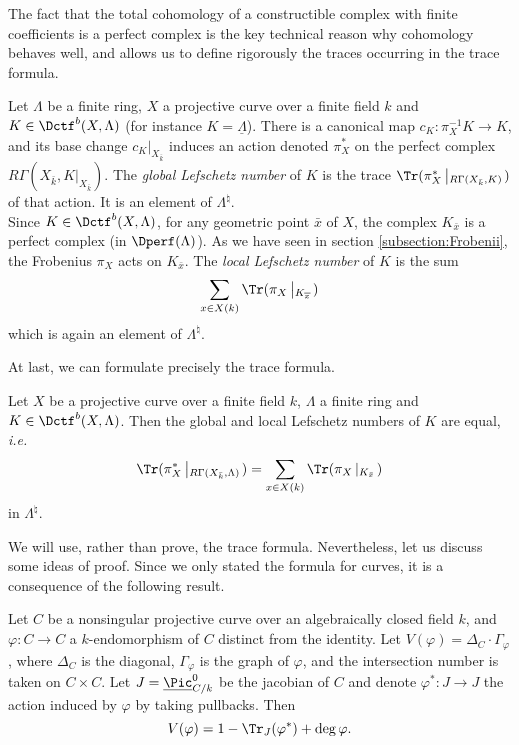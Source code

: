 The fact that the total cohomology of a constructible complex with finite coefficients is a perfect complex is the key technical reason why cohomology behaves well, and allows us to define rigorously the traces occurring in the trace formula.

\begin{defi}
Let $\Lambda$ be a finite ring, $X$ a projective curve over a finite field $k$ and $K\in \Dctf^b(X, \Lambda)$ (for instance $K=\underline\Lambda$). There is a canonical map $c_K: \pi_X^{-1}K \to K$, and its base change $c_K|_{X_{\bar k}}$ induces an action denoted $\pi_X^*$ on the perfect complex $R\Gamma(X_{\bar k}, K|_{X_{\bar k}})$. The \emph{global Lefschetz number} of $K$ is the trace $
\Tr(\pi_X^*\left|_{R\Gamma(X_{\bar k}, K)}\right.)$ of that action. It is an element of $\Lambda^\natural$.
\\
Since $K\in \Dctf^b (X, \Lambda)$, for any geometric point $\bar x$ of $X$, the complex $K_{\bar x}$ is a perfect complex (in $\Dperf(\Lambda)$). As we have seen in section \ref{subsection:Frobenii}, the Frobenius $\pi_X$ acts on $K_{\bar x}$. The \emph{local Lefschetz number} of $K$ is the sum  
$$
\sum_{x\in X(k)} \Tr(\pi_X \left|_{K_{\overline x}}\right.)
$$
which is again an element of $\Lambda^\natural$.
\end{defi}

At last, we can formulate precisely the trace formula.

\begin{thm} 
Let $X$ be a projective curve over a finite field $k$, $\Lambda$ a finite ring and $K \in \Dctf^b(X,\Lambda)$. Then the global and local Lefschetz numbers of $K$ are equal, {\it i.e.} 
$$
\Tr(\pi^*_X\left|_{R\Gamma(X_{\bar k}, \Lambda)}\right.)
=
\sum_{x\in X(k)} \Tr(\pi_X\left|_{K_{\bar x}}\right.)
$$
in $\Lambda^\natural$. 
\end{thm}

We will use, rather than prove, the trace formula. Nevertheless, let us discuss some ideas of proof. Since we only stated the formula for curves, it is a consequence of the following result.

\begin{thm}[Weil] \label{thm:WeilTraceFormula}
Let $C$ be a nonsingular projective curve over an algebraically closed field $k$, and $\varphi : C \to C$ a $k$-endomorphism of $C$ distinct from the identity. Let $V(\varphi) = \Delta_C \cdot \Gamma_\varphi$, where $\Delta_C$ is the diagonal, $\Gamma_\varphi$ is the graph of $\varphi$, and the intersection number is taken on $C\times C$. Let $J = \underline \Pic ^0_{C/k}$ be the jacobian of $C$ and denote $\varphi^* : J \to J$ the action induced by $\varphi$ by taking pullbacks. Then
$$
V(\varphi) = 1 - \Tr_J(\varphi^*) + \deg \varphi.
$$ 
\end{thm}


